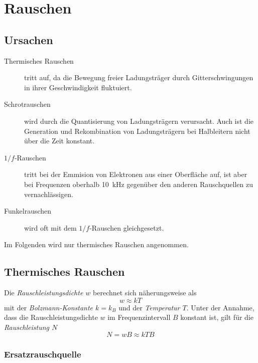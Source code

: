 \chapter{Rauschen}

\section{Ursachen}
\begin{description}
    \item[Thermisches Rauschen] tritt auf, da die Bewegung freier Ladungsträger durch
        Gitterschwingungen in ihrer Geschwindigkeit fluktuiert.
    \item[Schrotrauschen] wird durch die Quantisierung von Ladungsträgern verursacht. Auch ist die
        Generation und Rekombination von Ladungsträgern bei Halbleitern nicht über die Zeit konstant.
    \item[$1/f$-Rauschen] tritt bei der Emmision von Elektronen aus einer Oberfläche auf, ist aber
        bei Frequenzen oberhalb \SI{10}{\kilo\hertz} gegenüber den anderen Rauschquellen zu
        vernachlässigen.
    \item[Funkelrauschen] wird oft mit dem $1/f$-Rauschen gleichgesetzt.
\end{description}
Im Folgenden wird nur thermisches Rauschen angenommen.

\section{Thermisches Rauschen}
Die \emph{Rauschleistungsdichte $w$} berechnet sich näherungsweise als
\begin{equation}
    \boxed{w \approx kT}
\end{equation}
mit der \emph{Bolzmann-Konstante $k=k_B$} und der \emph{Temperatur $T$}.
Unter der Annahme, dass die Rauschleistungsdichte $w$ im Frequenzintervall $B$ konstant ist, gilt
für die \emph{Rauschleistung $N$}
\begin{equation}
    \boxed{N = wB \approx kTB}
\end{equation}

\subsection{Ersatzrauschquelle}

